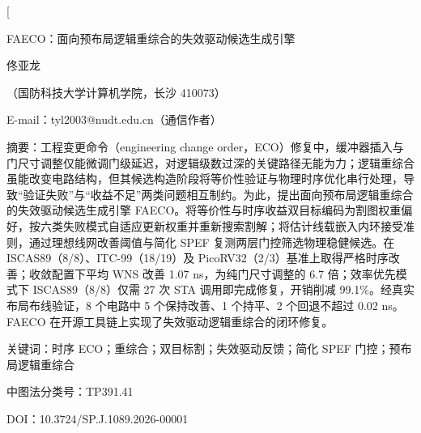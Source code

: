 \documentclass[twocolumn,10pt]{ctexart}
\let\songti\songfamily\let\heiti\heifamily\let\fangsong\fangfamily
\begin{document}
\pagestyle{plain}

\twocolumn[
\begin{center}
{\heiti{} FAECO：面向预布局逻辑重综合的失效驱动候选生成引擎}\par
\vspace{6pt}
{\fangsong{} 佟亚龙}\par
\vspace{4pt}
{\songti\fontsize{8}{12}\selectfont（国防科技大学计算机学院，长沙 410073）}\par\vspace{2pt}
{\songti\fontsize{8}{12}\selectfont E-mail：tyl2003@nudt.edu.cn（通信作者）}\par
\vspace{8pt}
\end{center}
\begin{flushleft}
{\heiti\fontsize{8.5}{13}\selectfont 摘\quad 要：}{\songti\fontsize{8.5}{13}\selectfont 工程变更命令（engineering change order，ECO）修复中，缓冲器插入与门尺寸调整仅能微调门级延迟，对逻辑级数过深的关键路径无能为力；逻辑重综合虽能改变电路结构，但其候选构造阶段将等价性验证与物理时序优化串行处理，导致“验证失败”与“收益不足”两类问题相互制约。为此，提出面向预布局逻辑重综合的失效驱动候选生成引擎 FAECO。将等价性与时序收益双目标编码为割图权重偏好，按六类失败模式自适应更新权重并重新搜索割解；将估计线载嵌入内环接受准则，通过理想线网改善阈值与简化 SPEF 复测两层门控筛选物理稳健候选。在 ISCAS89（8/8）、ITC-99（18/19）及 PicoRV32（2/3）基准上取得严格时序改善；收敛配置下平均 WNS 改善 1.07 ns，为纯门尺寸调整的 6.7 倍；效率优先模式下 ISCAS89（8/8）仅需 27 次 STA 调用即完成修复，开销削减 99.1\%。经真实布局布线验证，8 个电路中 5 个保持改善、1 个持平、2 个回退不超过 0.02 ns。FAECO 在开源工具链上实现了失效驱动逻辑重综合的闭环修复。}
\par
\vspace{4pt}
{\heiti\fontsize{8.5}{13}\selectfont 关键词：}{\songti\fontsize{8.5}{13}\selectfont 时序 ECO；重综合；双目标割；失效驱动反馈；简化 SPEF 门控；预布局逻辑重综合}\par
\vspace{2pt}
{\songti\fontsize{8.5}{13}\selectfont 中图法分类号：TP391.41}\par
\vspace{2pt}
{\songti\fontsize{8.5}{13}\selectfont DOI：10.3724/SP.J.1089.2026-00001}
\end{flushleft}
\vspace{6pt}
\end{document}
